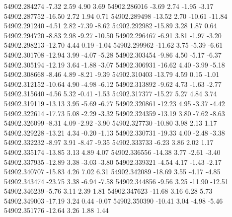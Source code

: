 54902.284274       -7.32        2.59        4.90        3.69
54902.286016       -3.69        2.74       -1.95       -3.17
54902.287752      -16.50        2.72        1.94        0.71
54902.289498      -13.52        2.70      -10.61      -11.84
54902.291240       -4.51        2.82       -7.39       -8.62
54902.292982      -15.89        3.28        1.87        0.64
54902.294720       -8.83        2.98       -9.27      -10.50
54902.296467       -6.91        3.81       -1.97       -3.20
54902.298213      -12.70        4.44        0.19       -1.04
54902.299962      -11.62        3.75       -5.39       -6.61
54902.301708      -12.94        3.99       -4.07       -5.28
54902.303454       -9.86        4.50       -5.17       -6.37
54902.305194      -12.19        3.64       -1.88       -3.07
54902.306931      -16.62        4.40       -3.99       -5.18
54902.308668       -8.46        4.89       -8.21       -9.39
54902.310403      -13.79        4.59        0.15       -1.01
54902.312152      -10.64        4.90       -4.98       -6.12
54902.313892       -9.62        4.73       -1.63       -2.77
54902.315640       -4.56        5.32       -0.41       -1.53
54902.317377      -15.27        5.27        4.84        3.74
54902.319119      -13.13        3.95       -5.69       -6.77
54902.320861      -12.23        4.95       -3.37       -4.42
54902.322614      -17.73        5.08       -2.29       -3.32
54902.324359      -13.19        3.80       -7.62       -8.63
54902.326099       -8.31        4.09       -2.92       -3.90
54902.327730      -10.80        3.98        2.13        1.17
54902.329228      -13.21        4.34       -0.20       -1.13
54902.330731      -19.33        4.00       -2.48       -3.38
54902.332232       -8.97        3.91       -8.47       -9.35
54902.333733       -6.23        3.86        2.02        1.17
54902.335174      -13.85        3.13        4.89        4.07
54902.336556      -14.38        3.77       -2.61       -3.40
54902.337935      -12.89        3.38       -3.03       -3.80
54902.339321       -4.54        4.17       -1.43       -2.17
54902.340707      -15.83        4.26        7.02        6.31
54902.342089      -18.69        3.55       -4.17       -4.85
54902.343474      -23.75        3.38       -6.94       -7.58
54902.344856       -9.56        3.25      -11.90      -12.51
54902.346239       -5.76        3.11        2.39        1.81
54902.347623      -11.68        3.16        6.28        5.73
54902.349003      -17.19        3.24        0.44       -0.07
54902.350390      -10.41        3.04       -4.98       -5.46
54902.351776      -12.64        3.26        1.88        1.44
